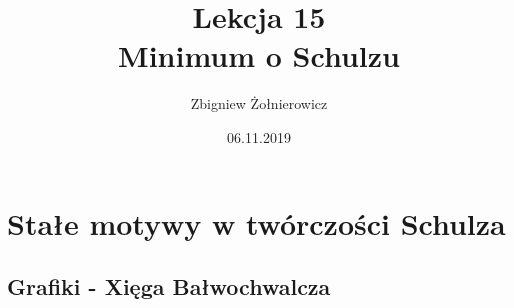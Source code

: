 \documentclass[a4paper]{article}
\begin{document}
\title{{\huge Lekcja 15} \\
{\large Minimum o Schulzu}}
\author{Zbigniew Żołnierowicz}
\date{06.11.2019}
\maketitle
\section{Stałe motywy w twórczości Schulza}
\subsection{Grafiki - Xięga Bałwochwalcza}
\end{document}
